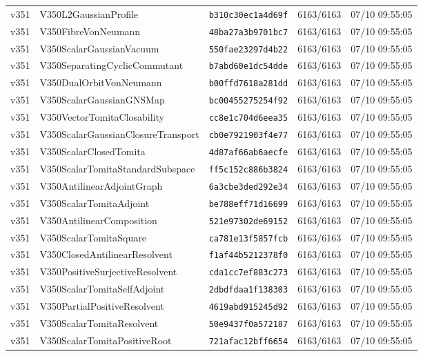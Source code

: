 \documentclass[11pt]{article}
\theoremstyle{definition}\newtheorem{deriv}{Derivação}
\begin{document}
{\begin{longtable}{@{}lllll@{}}
v351 & V350L2GaussianProfile & \texttt{b310c30ec1a4d69f} & 6163/6163 & 07/10 09:55:05 \\
v351 & V350FibreVonNeumann & \texttt{48ba27a3b9701bc7} & 6163/6163 & 07/10 09:55:05 \\
v351 & V350ScalarGaussianVacuum & \texttt{550fae23297d4b22} & 6163/6163 & 07/10 09:55:05 \\
v351 & V350SeparatingCyclicCommutant & \texttt{b7abd60e1dc54dde} & 6163/6163 & 07/10 09:55:05 \\
v351 & V350DualOrbitVonNeumann & \texttt{b00ffd7618a281dd} & 6163/6163 & 07/10 09:55:05 \\
v351 & V350ScalarGaussianGNSMap & \texttt{bc00455275254f92} & 6163/6163 & 07/10 09:55:05 \\
v351 & V350VectorTomitaClosability & \texttt{cc8e1c704d6eea35} & 6163/6163 & 07/10 09:55:05 \\
v351 & V350ScalarGaussianClosureTransport & \texttt{cb0e7921903f4e77} & 6163/6163 & 07/10 09:55:05 \\
v351 & V350ScalarClosedTomita & \texttt{4d87af66ab6aecfe} & 6163/6163 & 07/10 09:55:05 \\
v351 & V350ScalarTomitaStandardSubspace & \texttt{ff5c152c886b3824} & 6163/6163 & 07/10 09:55:05 \\
v351 & V350AntilinearAdjointGraph & \texttt{6a3cbe3ded292e34} & 6163/6163 & 07/10 09:55:05 \\
v351 & V350ScalarTomitaAdjoint & \texttt{be788eff71d16699} & 6163/6163 & 07/10 09:55:05 \\
v351 & V350AntilinearComposition & \texttt{521e97302de69152} & 6163/6163 & 07/10 09:55:05 \\
v351 & V350ScalarTomitaSquare & \texttt{ca781e13f5857fcb} & 6163/6163 & 07/10 09:55:05 \\
v351 & V350ClosedAntilinearResolvent & \texttt{f1af44b5212378f0} & 6163/6163 & 07/10 09:55:05 \\
v351 & V350PositiveSurjectiveResolvent & \texttt{cda1cc7ef883c273} & 6163/6163 & 07/10 09:55:05 \\
v351 & V350ScalarTomitaSelfAdjoint & \texttt{2dbdfdaa1f138303} & 6163/6163 & 07/10 09:55:05 \\
v351 & V350PartialPositiveResolvent & \texttt{4619abd915245d92} & 6163/6163 & 07/10 09:55:05 \\
v351 & V350ScalarTomitaResolvent & \texttt{50e9437f0a572187} & 6163/6163 & 07/10 09:55:05 \\
v351 & V350ScalarTomitaPositiveRoot & \texttt{721afac12bff6654} & 6163/6163 & 07/10 09:55:05 \\

\end{longtable}}
\end{document}
